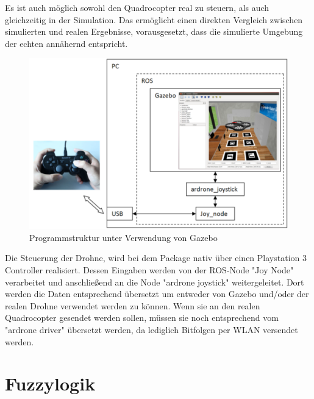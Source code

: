  Es ist auch möglich sowohl den Quadrocopter real zu steuern, als auch gleichzeitig in der Simulation. Das ermöglicht einen direkten Vergleich zwischen simulierten und realen Ergebnisse, vorausgesetzt, dass die simulierte Umgebung der echten annähernd entspricht.
  \begin{figure}[ht]
  	\centering
  	\includegraphics[scale=1.0]{Bilder/sim_structure.png}
  	\caption[Programmstruktur unter Verwendung von Gazebo]{Programmstruktur unter Verwendung von Gazebo \cite{sim_structure}}
  	
  \end{figure} %
Die Steuerung der Drohne, wird bei dem Package nativ über einen Playstation 3 Controller realisiert. Dessen Eingaben werden von der ROS-Node "Joy Node" verarbeitet und anschließend an die Node "ardrone joystick" weitergeleitet. Dort werden die Daten entsprechend übersetzt um entweder von Gazebo und/oder der realen Drohne verwendet werden zu können. Wenn sie an den realen Quadrocopter gesendet werden sollen, müssen sie noch entsprechend vom "ardrone driver" übersetzt werden, da lediglich Bitfolgen per WLAN versendet werden. 
\section{Fuzzylogik}
